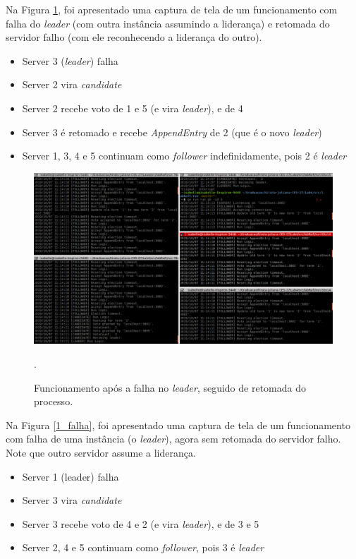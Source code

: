 \documentclass[journal,onecolumn]{IEEEtran}
\begin{document}
Na Figura \ref{falha_no_lider}, foi apresentado uma captura de tela de um funcionamento com falha do \textit{leader} (com outra instância assumindo a liderança) e retomada do servidor falho (com ele reconhecendo a liderança do outro).

\begin{itemize}
\item Server 3 (\textit{leader}) falha
\item Server 2 vira \textit{candidate}
\item Server 2 recebe voto de 1 e 5 (e vira \textit{leader}), e de 4
\item Server 3 é retomado e recebe \textit{AppendEntry} de 2 (que é o novo \textit{leader})
\item Server 1, 3, 4 e 5 continuam como \textit{follower} indefinidamente, pois 2 é \textit{leader}
\end{itemize}

\begin{figure}[H]
\centering
\centerline{\includegraphics[scale=0.4]{imagens/falha_no_lider.png}}
\caption{Funcionamento após a falha no \textit{leader}, seguido de retomada do processo.}.
\label{falha_no_lider}
\end{figure}

Na Figura \ref{1_falha}, foi apresentado uma captura de tela de um funcionamento com falha de uma instância (o \textit{leader}), agora sem retomada do servidor falho. Note que outro servidor assume a liderança.

\begin{itemize}
\item Server 1 (leader) falha
\item Server 3 vira \textit{candidate}
\item Server 3 recebe voto de 4 e 2 (e vira \textit{leader}), e de 3 e 5
\item Server 2, 4 e 5 continuam como \textit{follower}, pois 3 é \textit{leader}
\end{itemize}
\end{document}
